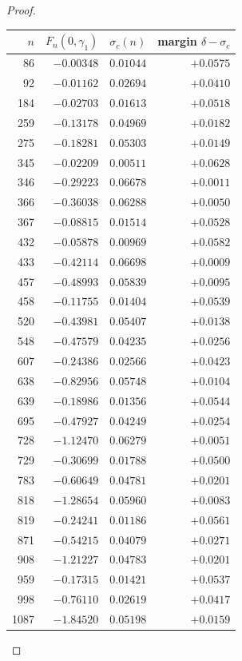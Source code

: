 \documentclass[11pt]{article}
\begin{document}
\begin{proof}
\begin{center}
\begin{tabular}{rrrr}
\toprule
$n$ & $F_n(0,\gamma_1)$ & $\sigma_c(n)$ & margin $\delta - \sigma_c$ \\
\midrule
86  & $-0.00348$ & $0.01044$ & $+0.0575$ \\
92  & $-0.01162$ & $0.02694$ & $+0.0410$ \\
184 & $-0.02703$ & $0.01613$ & $+0.0518$ \\
259 & $-0.13178$ & $0.04969$ & $+0.0182$ \\
275 & $-0.18281$ & $0.05303$ & $+0.0149$ \\
345 & $-0.02209$ & $0.00511$ & $+0.0628$ \\
346 & $-0.29223$ & $0.06678$ & $+0.0011$ \\
366 & $-0.36038$ & $0.06288$ & $+0.0050$ \\
367 & $-0.08815$ & $0.01514$ & $+0.0528$ \\
432 & $-0.05878$ & $0.00969$ & $+0.0582$ \\
433 & $-0.42114$ & $0.06698$ & $+0.0009$ \\
457 & $-0.48993$ & $0.05839$ & $+0.0095$ \\
458 & $-0.11755$ & $0.01404$ & $+0.0539$ \\
520 & $-0.43981$ & $0.05407$ & $+0.0138$ \\
548 & $-0.47579$ & $0.04235$ & $+0.0256$ \\
607 & $-0.24386$ & $0.02566$ & $+0.0423$ \\
638 & $-0.82956$ & $0.05748$ & $+0.0104$ \\
639 & $-0.18986$ & $0.01356$ & $+0.0544$ \\
695 & $-0.47927$ & $0.04249$ & $+0.0254$ \\
728 & $-1.12470$ & $0.06279$ & $+0.0051$ \\
729 & $-0.30699$ & $0.01788$ & $+0.0500$ \\
783 & $-0.60649$ & $0.04781$ & $+0.0201$ \\
818 & $-1.28654$ & $0.05960$ & $+0.0083$ \\
819 & $-0.24241$ & $0.01186$ & $+0.0561$ \\
871 & $-0.54215$ & $0.04079$ & $+0.0271$ \\
908 & $-1.21227$ & $0.04783$ & $+0.0201$ \\
959 & $-0.17315$ & $0.01421$ & $+0.0537$ \\
998 & $-0.76110$ & $0.02619$ & $+0.0417$ \\
1087 & $-1.84520$ & $0.05198$ & $+0.0159$ \\

\end{tabular}
\end{center}
\end{proof}
\end{document}
